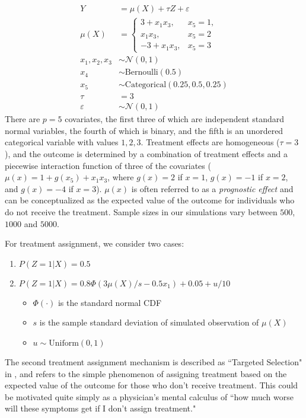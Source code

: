 \documentclass[aos]{imsart}
\begin{document}
\begin{align*}
Y &= \mu(X) + \tau Z + \varepsilon\\
\mu(X) &= 
\begin{cases}
3 + x_1 x_3,&  x_5 = 1,\\
x_1 x_3,&  x_5 = 2\\
-3 + x_1 x_3,&  x_5 = 3
\end{cases} \\
x_1, x_2, x_3 &\sim \mathcal{N}(0, 1)\\
x_4 &\sim \textrm{Bernoulli}(0.5)\\
x_5 &\sim \textrm{Categorical}(0.25, 0.5, 0.25)\\
\tau &= 3\\
\varepsilon &\sim \mathcal{N}(0, 1)
\end{align*}
There are $p = 5$ covariates, the first three of which are independent standard normal variables, the fourth of which is binary, 
and the fifth is an unordered categorical variable with values $1, 2, 3$. Treatment effects are homogeneous ($\tau = 3$), and 
the outcome is determined by a combination of treatment effects and a piecewise interaction function of three of the covariates
($\mu(x) = 1 + g(x_5) + x_1 x_3$, where $g(x) = 2$ if $x = 1$, $g(x) = -1$ if $x = 2$, and $g(x) = -4$ if $x = 3$). 
$\mu(x)$ is often referred to as a \textit{prognostic effect} and can be conceptualized as the expected value of 
the outcome for individuals who do not receive the treatment.
Sample sizes in our simulations vary between $500$, $1000$ and $5000$. 

For treatment assignment, we consider two cases:

\begin{enumerate}
\item $P(Z = 1 | X) = 0.5$
\item $P(Z = 1 | X) = 0.8\Phi(3 \mu(X) / s - 0.5 x_1) + 0.05 + u / 10$
\begin{itemize}
	\item $\Phi(\cdot)$ is the standard normal CDF
	\item $s$ is the sample standard deviation of simulated observation of $\mu(X)$
	\item $u \sim \mathrm{Uniform}(0, 1)$ 
\end{itemize}
\end{enumerate}

The second treatment assignment mechanism is described as ``Targeted Selection" in \cite{hahn2020bayesian}, and 
refers to the simple phenomenon of assigning treatment based on the expected value of the outcome for those who don't receive 
treatment. This could be motivated quite simply as a physician's mental calculus of ``how much worse will these symptoms get if I don't 
assign treatment."
\end{document}
